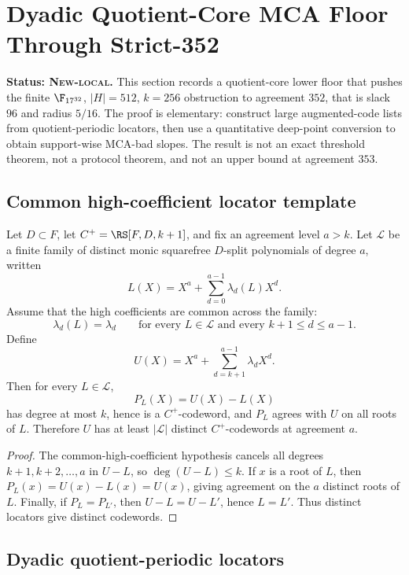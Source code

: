 \section{Dyadic Quotient-Core MCA Floor Through Strict-352}
\label{sec:strict352-quotient-core}

\textbf{Status: \textsc{New-local}.}
This section records a quotient-core lower floor that pushes the finite
\(\F_{17^{32}}\), \(|H|=512\), \(k=256\) obstruction to agreement \(352\),
that is slack \(96\) and radius \(5/16\).  The proof is elementary: construct
large augmented-code lists from quotient-periodic locators, then use a
quantitative deep-point conversion to obtain support-wise MCA-bad slopes.  The
result is not an exact threshold theorem, not a protocol theorem, and not an
upper bound at agreement \(353\).

\subsection{Common high-coefficient locator template}

\begin{proposition}
\label{prop:common-high-coeff-template}
Let \(D\subset F\), let \(C^+=\RS[F,D,k+1]\), and fix an agreement level
\(a>k\).  Let \(\mathcal L\) be a finite family of distinct monic squarefree
\(D\)-split polynomials of degree \(a\), written
\[
  L(X)=X^a+\sum_{d=0}^{a-1}\lambda_d(L)X^d .
\]
Assume that the high coefficients are common across the family:
\[
  \lambda_d(L)=\lambda_d
  \qquad\text{for every }L\in\mathcal L
  \text{ and every }k+1\le d\le a-1.
\]
Define
\[
  U(X)=X^a+\sum_{d=k+1}^{a-1}\lambda_dX^d .
\]
Then for every \(L\in\mathcal L\),
\[
  P_L(X)=U(X)-L(X)
\]
has degree at most \(k\), hence is a \(C^+\)-codeword, and \(P_L\) agrees with
\(U\) on all roots of \(L\).  Therefore \(U\) has at least \(|\mathcal L|\)
distinct \(C^+\)-codewords at agreement \(a\).
\end{proposition}

\begin{proof}
The common-high-coefficient hypothesis cancels all degrees
\(k+1,k+2,\ldots,a\) in \(U-L\), so \(\deg(U-L)\le k\).  If \(x\) is a root of
\(L\), then \(P_L(x)=U(x)-L(x)=U(x)\), giving agreement on the \(a\) distinct
roots of \(L\).  Finally, if \(P_L=P_{L'}\), then \(U-L=U-L'\), hence
\(L=L'\).  Thus distinct locators give distinct codewords.
\end{proof}

\subsection{Dyadic quotient-periodic locators}

